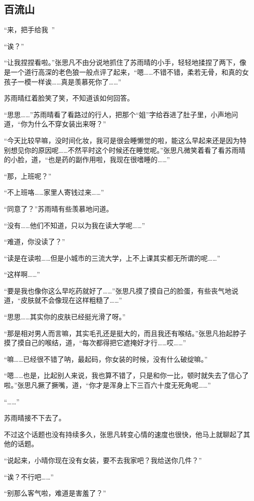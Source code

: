 \subsection{百流山}

“来，把手给我~”

“诶？”

“让我捏捏看啦。”张思凡不由分说地抓住了苏雨晴的小手，轻轻地揉捏了两下，像是一个道行高深的老色狼一般点评了起来，“嗯……不错不错，柔若无骨，和真的女孩子一模一样诶……真是羡慕死你了……”

苏雨晴红着脸笑了笑，不知道该如何回答。

“思思……”苏雨晴看了看路过的行人，把那个“姐”字给吞进了肚子里，小声地问道，“你为什么不穿女装出来呀？”

“今天比较早嘛，没时间化妆，我可是很会睡懒觉的啦，能这么早起来还是因为特别想见你的原因呢……不然平时这个时候还在睡觉呢。”张思凡微笑着看了看苏雨晴的小脸，道，“也是药的副作用啦，我现在很嗜睡的……”

“那，上班呢？”

“不上班咯……家里人寄钱过来……”

“同意了？”苏雨晴有些羡慕地问道。

“没有……他们不知道，只以为我在读大学呢……”

“难道，你没读了？”

“读是在读啦……但是小城市的三流大学，上不上课其实都无所谓的呢……”

“这样啊……”

“要是我也像你这么早吃药就好了……”张思凡摸了摸自己的脸蛋，有些丧气地说道，“皮肤就不会像现在这样粗糙了……”

“思思……其实你的皮肤已经挺光滑了呀。”

“那是相对男人而言嘛，其实毛孔还是挺大的，而且我还有喉结。”张思凡抬起脖子摸了摸自己的喉结，道，“每次都得把它遮掩好才行……哎……”

“嘛……已经很不错了呐，最起码，你女装的时候，没有什么破绽嘛。”

“嗯……也是，比起别人来说，我也算不错了，只是和你一比，顿时就失去了信心了啦。”张思凡撅了撅嘴，道，“你才是浑身上下三百六十度无死角呢……”

“……”

苏雨晴接不下去了。

不过这个话题也没有持续多久，张思凡转变心情的速度也很快，他马上就聊起了其他的话题。

“说起来，小晴你现在没有女装，要不去我家吧？我给送你几件？”

“诶？不行吧……”

“别那么客气啦，难道是害羞了？”

